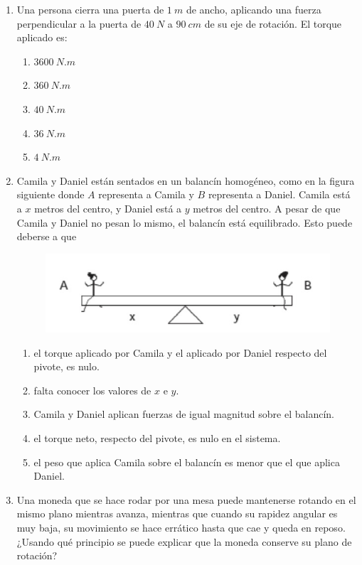 \documentclass[letterpaper]{article}
\newenvironment{enumalf}
{\begin{enumerate}[label=\Alph*)]}
{\end{enumerate}}
\begin{document}
\begin{enumerate}
\item Una persona cierra una puerta de $1\ \si{m}$ de ancho, aplicando una fuerza perpendicular a la puerta de $40\ \si{N}$ a $90\ \si{cm}$ de su eje de rotación. El torque aplicado es:

\begin{enumalf}
\item $3600\ \si{N.m}$
\item $360\ \si{N.m}$
\item $40\ \si{N.m}$
\item $36\ \si{N.m}$
\item $4\ \si{N.m}$
\end{enumalf}

\pagebreak

\item Camila y Daniel están sentados en un balancín homogéneo, como en la figura siguiente donde $A$ representa a Camila y $B$ representa a Daniel. Camila está a $x$ metros del centro, y Daniel está a $y$ metros del centro. A pesar de que Camila y Daniel no pesan lo mismo, el balancín está equilibrado. Esto puede deberse a que

\begin{figure}[h]
\centering
\includegraphics[scale=0.5]{balancin.png}

\end{figure}

\begin{enumalf}
\item el torque aplicado por Camila y el aplicado por Daniel respecto del pivote, es nulo.
\item falta conocer los valores de $x$ e $y$.
\item Camila y Daniel aplican fuerzas de igual magnitud sobre el balancín.
\item el torque neto, respecto del pivote, es nulo en el sistema.
\item el peso que aplica Camila sobre el balancín es menor que el que aplica Daniel.
\end{enumalf}

\item Una moneda que se hace rodar por una mesa puede mantenerse rotando en el mismo plano mientras avanza, mientras que cuando su rapidez angular es muy baja, su movimiento se hace errático hasta que cae y queda en reposo. ¿Usando qué principio se puede explicar que la moneda conserve su plano de rotación?


\end{enumerate}
\end{document}
